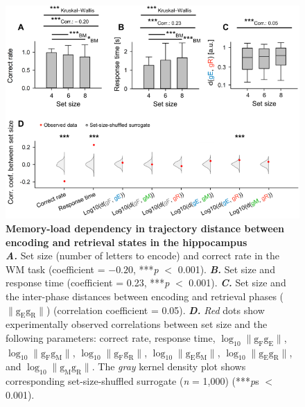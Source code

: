 \documentclass[final,3p,times,twocolumn]{elsarticle}
\begin{document}
        \begin{figure}[ht]
        	\centering
            \includegraphics[width=1\textwidth]{./src/figures/.png/Figure_ID_03.png}
        	\caption{\textbf{
Memory-load dependency in trajectory distance between encoding and retrieval states in the hippocampus 
}
\smallskip
\\
\textbf{\textit{A.}} Set size (number of letters to encode) and correct rate in the WM task (coefficient = $-0.20$, ***\textit{p} $<$ 0.001). \textbf{\textit{B.}} Set size and response time (coefficient = 0.23, ***\textit{p} $<$ 0.001).  \textbf{\textit{C.}} Set size and the inter-phase distances between encoding and retrieval phases ($\lVert \mathrm{g_{E}g_{R}} \rVert$) (correlation coefficient = 0.05). \textbf{\textit{D.}} \textit{Red} dots show experimentally observed correlations between set size and the following parameters: correct rate, response time, $\log_{10}{\lVert \mathrm{g_{F}g_{E}} \rVert}$, $\log_{10}{\lVert \mathrm{g_{F}g_{M}} \rVert}$, $\log_{10}{\lVert \mathrm{g_{F}g_{R}} \rVert}$, $\log_{10}{\lVert \mathrm{g_{E}g_{M}} \rVert}$, $\log_{10}{\lVert \mathrm{g_{E}g_{R}} \rVert}$, and $\log_{10}{\lVert \mathrm{g_{M}g_{R}} \rVert}$. The \textit{gray} kernel density plot shows corresponding set-size-shuffled surrogate (\textit{n} = 1,000) (***\textit{p}s $<$ 0.001).
}
        	\label{fig:03}
        \end{figure}
        \clearpage
\end{document}
